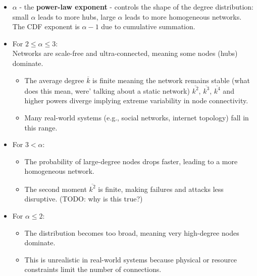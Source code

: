 \documentclass[crop=false]{standalone}
\begin{document}
\begin{itemize}
    \item $\alpha$  - the \textbf{power-law exponent} -  controls the shape of the degree distribution: small $\alpha$ leads to more hubs, large $\alpha$ leads to more homogeneous networks.
The CDF exponent is $\alpha−1$ due to cumulative summation.
\end{itemize}
\begin{itemize}
    \item For $2 \leq \alpha \leq 3$:\\ Networks are scale-free and ultra-connected, meaning some nodes (hubs) dominate.
        \begin{itemize}
            \item The average degree $\overline{k}$ is finite meaning the network remains stable (what does this mean, were' talking about a static network) 
            $\overline{k^2}$, $\overline{k^3}$, $\overline{k^4}$ and higher powers diverge  implying extreme variability in node connectivity.
        \end{itemize}
        \begin{itemize}
            \item Many real-world systems (e.g., social networks, internet topology) fall in this range.
        \end{itemize}
    \item For $3 < \alpha$:
    \begin{itemize}
        \item The probability of large-degree nodes drops faster, leading to a more homogeneous network.
        \item The second moment $\overline{k^2}$ is finite, making failures and attacks less disruptive. (TODO: why is this true?)
    \end{itemize}
    \item For $\alpha \leq 2$:
    \begin{itemize}
        \item The distribution becomes too broad, meaning very high-degree nodes dominate.
    \end{itemize}
    \begin{itemize}
        \item This is unrealistic in real-world systems because physical or resource constraints limit the number of connections.
    \end{itemize}
\end{itemize}
\end{document}
